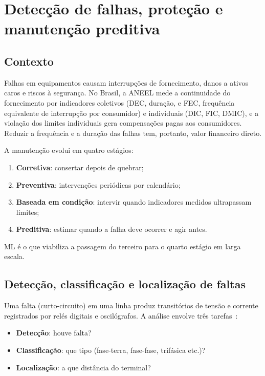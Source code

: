 \documentclass[10pt,a4paper,oneside]{article}
\begin{document}
\section{Detecção de falhas, proteção e manutenção preditiva}

\subsection{Contexto}

Falhas em equipamentos causam interrupções de fornecimento, danos a
ativos caros e riscos à segurança. No Brasil, a ANEEL mede a continuidade do
fornecimento por indicadores coletivos (DEC, duração, e FEC, frequência
equivalente de interrupção por consumidor) e individuais (DIC, FIC, DMIC), e
a violação dos limites individuais gera compensações pagas aos consumidores.
Reduzir a frequência e a duração das falhas tem, portanto, valor financeiro
direto.

A manutenção evolui em quatro estágios:
\begin{enumerate}
  \item \textbf{Corretiva}: consertar depois de quebrar;
  \item \textbf{Preventiva}: intervenções periódicas por calendário;
  \item \textbf{Baseada em condição}: intervir quando indicadores medidos
    ultrapassam limites;
  \item \textbf{Preditiva}: estimar quando a falha deve ocorrer e agir antes.
\end{enumerate}
ML é o que viabiliza a passagem do terceiro para o quarto estágio em larga
escala.

\subsection{Detecção, classificação e localização de faltas}

Uma falta (curto-circuito) em uma linha produz transitórios de tensão e
corrente registrados por relés digitais e oscilógrafos. A análise envolve três
tarefas~\cite{faultsurvey}:
\begin{itemize}
  \item \textbf{Detecção}: houve falta?
  \item \textbf{Classificação}: que tipo (fase-terra, fase-fase, trifásica
    etc.)?
  \item \textbf{Localização}: a que distância do terminal?
\end{itemize}
\end{document}

